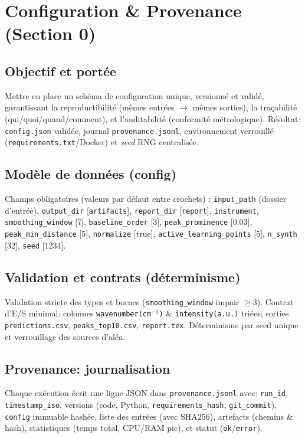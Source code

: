 
\section{Configuration \& Provenance (Section 0)}

\subsection{Objectif et portée}
Mettre en place un schéma de configuration unique, versionné et validé, garantissant la reproductibilité (mêmes entrées $\rightarrow$ mêmes sorties), la traçabilité (qui/quoi/quand/comment), et l'auditabilité (conformité métrologique). Résultat: \texttt{config.json} validée, journal \texttt{provenance.jsonl}, environnement verrouillé (\texttt{requirements.txt}/Docker) et \textit{seed} RNG centralisée.

\subsection{Modèle de données (config)}
Champs obligatoires (valeurs par défaut entre crochets) : \texttt{input\_path} (dossier d'entrée), \texttt{output\_dir} [\texttt{artifacts}], \texttt{report\_dir} [\texttt{report}], \texttt{instrument}, \texttt{smoothing\_window} [7], \texttt{baseline\_order} [3], \texttt{peak\_prominence} [0.03], \texttt{peak\_min\_distance} [5], \texttt{normalize} [true], \texttt{active\_learning\_points} [5], \texttt{n\_synth} [32], \texttt{seed} [1234].

\subsection{Validation et contrats (déterminisme)}
Validation stricte des types et bornes (\texttt{smoothing\_window} impair $\geq 3$). Contrat d'E/S minimal: colonnes \texttt{wavenumber(cm$^{-1}$)} \& \texttt{intensity(a.u.)} triées; sorties \texttt{predictions.csv}, \texttt{peaks\_top10.csv}, \texttt{report.tex}. Déterminisme par seed unique et verrouillage des sources d'aléa.

\subsection{Provenance: journalisation}
Chaque exécution écrit une ligne JSON dans \texttt{provenance.jsonl} avec: \texttt{run\_id}, \texttt{timestamp\_iso}, versions (code, Python, \texttt{requirements\_hash}, \texttt{git\_commit}), \texttt{config} immuable hashée, liste des entrées (avec SHA256), artefacts (chemins \& hash), statistiques (temps total, CPU/RAM pic), et statut (\texttt{ok}/\texttt{error}).

